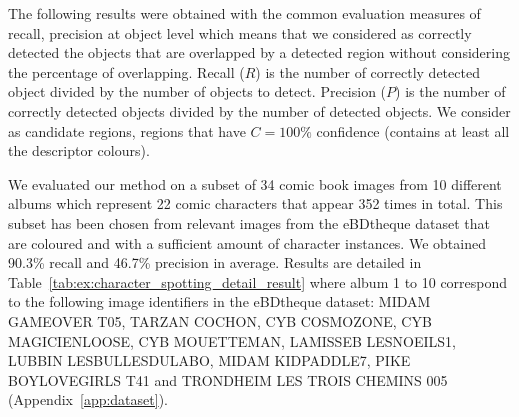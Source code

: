 The following results were obtained with the common evaluation measures of recall, precision at object level which means that we considered as correctly detected the objects that are overlapped by a detected region without considering the percentage of overlapping.
Recall ($R$) is the number of correctly detected object divided by the number of objects to detect.
Precision ($P$) is the number of correctly detected objects divided by the number of detected objects.
We consider as candidate regions, regions that have $C=100\%$ confidence (contains at least all the descriptor colours).%

We evaluated our method on a subset of 34 comic book images from 10 different albums which represent 22 comic characters that appear 352 times in total.
This subset has been chosen from relevant images from the eBDtheque dataset that are coloured and with a sufficient amount of character instances. 
We obtained 90.3\% recall and 46.7\% precision in average.
Results are detailed in Table~\ref{tab:ex:character_spotting_detail_result} where album 1 to 10 correspond to the following image identifiers in the eBDtheque dataset: MIDAM GAMEOVER T05, TARZAN COCHON, CYB COSMOZONE, CYB MAGICIENLOOSE, 
CYB MOUETTEMAN, LAMISSEB LESNOEILS1, LUBBIN LESBULLESDULABO, MIDAM KIDPADDLE7, PIKE BOYLOVEGIRLS T41 and TRONDHEIM LES TROIS CHEMINS 005 (Appendix~\ref{app:dataset}).



